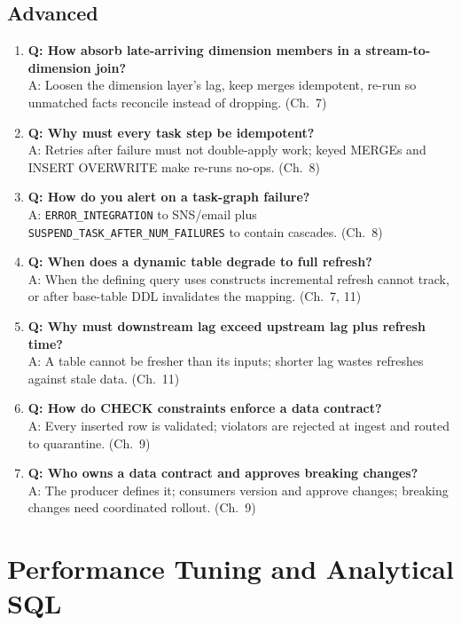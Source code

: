 \subsection{Advanced}
\begin{enumerate}
    \item \textbf{Q: How absorb late-arriving dimension members in a stream-to-dimension join?}\\
    A: Loosen the dimension layer's lag, keep merges idempotent, re-run so unmatched facts reconcile instead of dropping. (Ch.~7)
    \item \textbf{Q: Why must every task step be idempotent?}\\
    A: Retries after failure must not double-apply work; keyed MERGEs and INSERT OVERWRITE make re-runs no-ops. (Ch.~8)
    \item \textbf{Q: How do you alert on a task-graph failure?}\\
    A: \texttt{ERROR\_INTEGRATION} to SNS/email plus \texttt{SUSPEND\_TASK\_AFTER\_NUM\_FAILURES} to contain cascades. (Ch.~8)
    \item \textbf{Q: When does a dynamic table degrade to full refresh?}\\
    A: When the defining query uses constructs incremental refresh cannot track, or after base-table DDL invalidates the mapping. (Ch.~7, 11)
    \item \textbf{Q: Why must downstream lag exceed upstream lag plus refresh time?}\\
    A: A table cannot be fresher than its inputs; shorter lag wastes refreshes against stale data. (Ch.~11)
    \item \textbf{Q: How do CHECK constraints enforce a data contract?}\\
    A: Every inserted row is validated; violators are rejected at ingest and routed to quarantine. (Ch.~9)
    \item \textbf{Q: Who owns a data contract and approves breaking changes?}\\
    A: The producer defines it; consumers version and approve changes; breaking changes need coordinated rollout. (Ch.~9)
\end{enumerate}

\section{Performance Tuning and Analytical SQL}

